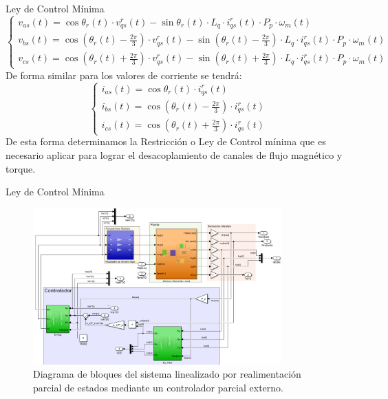 \documentclass[12pt]{beamer}
\begin{document}
\begin{frame}{Ley de Control Mínima}
\begin{equation}
\begin{cases}
v_{as}(t) = \cos \theta_r(t)\cdot v^r_{qs}(t) - \sin \theta_r(t)\cdot L_q\cdot i^r_{qs}(t)\cdot P_p\cdot\omega_m(t) \\
v_{bs}(t) = \cos\left(\theta_r(t)-\frac{2\pi}{3}\right)\cdot v^r_{qs}(t) - \sin\left(\theta_r(t)-\frac{2\pi}{3}\right)\cdot L_q\cdot i^r_{qs}(t)\cdot P_p\cdot\omega_m(t) \\
v_{cs}(t) = \cos\left(\theta_r(t)+\frac{2\pi}{3}\right)\cdot v^r_{qs}(t) - \sin\left(\theta_r(t)+\frac{2\pi}{3}\right)\cdot L_q\cdot i^r_{qs}(t)\cdot P_p\cdot\omega_m(t)
\end{cases}
\end{equation}
De forma similar para los valores de corriente se tendrá:
\begin{equation}
\begin{cases}
i_{as}(t) = \cos \theta_r(t)\cdot i^r_{qs}(t)  \\
i_{bs}(t) = \cos\left(\theta_r(t)-\frac{2\pi}{3}\right)\cdot i^r_{qs}(t) \\
i_{cs}(t) = \cos\left(\theta_r(t)+\frac{2\pi}{3}\right)\cdot i^r_{qs}(t)
\end{cases}
\end{equation}
De esta forma determinamos la Restricción o Ley de Control mínima que es necesario aplicar para lograr el desacoplamiento de canales de flujo magnético y torque.
\end{frame}

\begin{frame}{Ley de Control Mínima}
    \begin{figure}[h]
    \centering
    \includegraphics[width=0.85\textwidth]{Imagenes/BloquesLinealizacionRealimentacionNoLineal.png}
    \caption{Diagrama de bloques del sistema linealizado por realimentación parcial de estados mediante un controlador
    parcial externo.}
    \end{figure}
\end{frame}
\end{document}
